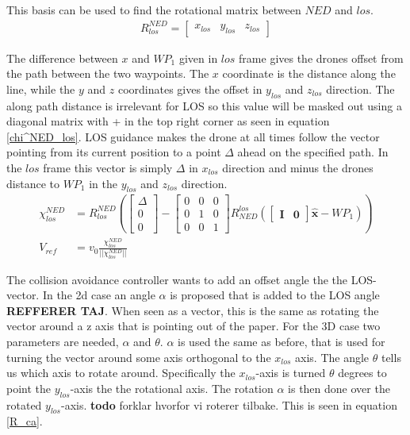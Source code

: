This basis can be used to find the rotational matrix between $NED$ and $los$.
\begin{align}
    R^{NED}_{los} = \begin{bmatrix} x_{los} & y_{los} & z_{los}\end{bmatrix}
\end{align}

The difference between $x$ and $WP_1$ given in $los$ frame gives the drones offset from the path between the two waypoints. The $x$ coordinate is the distance along the line, while the $y$ and $z$ coordinates gives the offset in $y_{los}$ and $z_{los}$ direction. The along path distance is irrelevant for LOS so this value will be masked out using a diagonal matrix with + in the top right corner as seen in equation \ref{chi^NED_los}. LOS guidance makes the drone at all times follow the vector pointing from its current position to a point $\Delta$ ahead on the specified path. In the $los$ frame this vector is simply $\Delta$ in $x_{los}$ direction and minus the drones distance to $WP_1$ in the $y_{los}$ and $z_{los}$ direction. 
\begin{align}
   \chi^{NED}_{los} & = R^{NED}_{los} \left(  \begin{bmatrix}\Delta \\ 0 \\ 0\end{bmatrix} - \begin{bmatrix} 0 & 0 & 0 \\ 0 & 1 & 0 \\ 0 & 0 & 1 \end{bmatrix} R^{los}_{NED} (\begin{bmatrix} \mathbf{I} & \mathbf{0} \end{bmatrix} \hat{\textbf{x}} - WP_1) \right) \label{chi^NED_los} \\
   V_{ref} & = v_0 \frac{\chi^{NED}_{los} }{|| \chi^{NED}_{los} ||}
\end{align}

The collision avoidance controller wants to add an offset angle the the LOS-vector. In the 2d case an angle $\alpha$ is proposed that is added to the LOS angle \textbf{REFFERER TAJ}. When seen as a vector, this is the same as rotating the vector around a z axis that is pointing out of the paper. For the 3D case two parameters are needed, $\alpha$ and $\theta$. $\alpha$ is used the same as before, that is used for turning the vector around some axis orthogonal to the $x_{los}$ axis. The angle $\theta$ tells us which axis to rotate around. Specifically the $x_{los}$-axis is turned $\theta$ degrees to point the $y_{los}$-axis the the rotational axis. The rotation $\alpha$ is then done over the rotated $y_{los}$-axis. \textbf{todo} forklar hvorfor vi roterer tilbake. This is seen in equation \ref{R_ca}.

